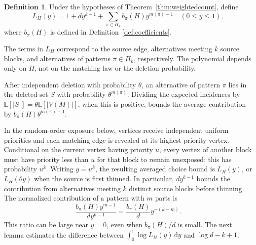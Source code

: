 \documentclass[11pt,reqno]{amsart}
\numberwithin{equation}{section}
\theoremstyle{plain}
\theoremstyle{definition}
\newtheorem{definition}[theorem]{Definition}
\newcommand{\E}{\mathbb E}
\newcommand{\dd}{\,\mathrm d}
\begin{document}
\begin{definition}\label{def:exposure-polynomial}
    Under the hypotheses of Theorem~\ref{thm:weightedcount}, define
    \begin{equation}\label{eq:pattern-polynomial}
        L_H(y)=1+dy^{k-1}+\sum_{\pi\in\Pi_k}b_\pi(H) y^{m(\pi)-1}
        \quad(0\le y\le1),
    \end{equation}
    where $b_\pi(H)$ is defined in Definition~\ref{def:coefficients}.
\end{definition}

The terms in $L_H$ correspond to the source edge, alternatives meeting $k$ source blocks, and alternatives of patterns $\pi\in\Pi_k$, respectively.
The polynomial depends only on $H$, not on the matching law or the deletion probability.

After independent deletion with probability $\theta$, an alternative of pattern $\pi$ lies in the deleted set $S$ with probability $\theta^{m(\pi)}$.
Dividing the expected incidences by $\E[|S|]=\theta\E[|V(M)|]$, when this is positive, bounds the average contribution by $b_\pi(H)\theta^{m(\pi)-1}$.

In the random-order exposure below, vertices receive independent uniform priorities and each matching edge is revealed at its highest-priority vertex.
Conditional on the current vertex having priority $u$, every vertex of another block must have priority less than $u$ for that block to remain unexposed; this has probability $u^k$.
Writing $y=u^k$, the resulting averaged choice bound is $L_H(y)$, or $L_H(\theta y)$ when the source is first thinned.
In particular, $dy^{k-1}$ bounds the contribution from alternatives meeting $k$ distinct source blocks before thinning.
The normalized contribution of a pattern with $m$ parts is
\[
    \frac{b_\pi(H) y^{m-1}}{dy^{k-1}}=\frac{b_\pi(H)}{d}y^{-(k-m)}.
\]
This ratio can be large near $y=0$, even when $b_\pi(H)/d$ is small.
The next lemma estimates the difference between $\int_0^1\log L_H(y)\dd y$ and $\log d-k+1$.
\end{document}
